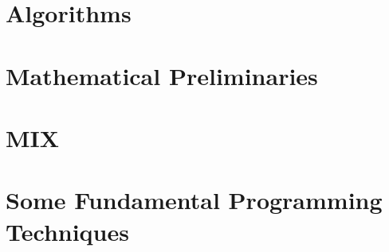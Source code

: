 \documentclass[Main.tex]{subfiles}
\begin{document}
\section{Algorithms}


\section{Mathematical Preliminaries}


\section{MIX}


\section{Some Fundamental Programming Techniques}

\end{document}
